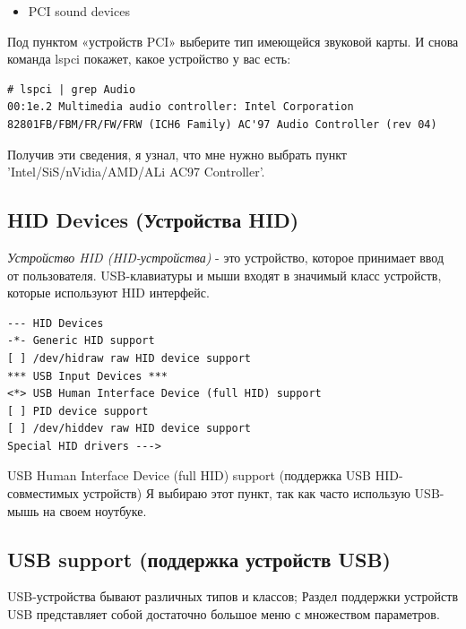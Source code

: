 \documentclass[10pt]{book}
\begin{document}
\begin{itemize}
\item PCI sound devices
\end{itemize}

Под пунктом «устройств PCI» выберите тип имеющейся звуковой карты. И снова команда lspci покажет, какое устройство у вас есть:

\vspace{3mm}
\begin{tcolorbox}
\begin{lstlisting}
# lspci | grep Audio
00:1e.2 Multimedia audio controller: Intel Corporation 82801FB/FBM/FR/FW/FRW (ICH6 Family) AC'97 Audio Controller (rev 04)
\end{lstlisting}
\end{tcolorbox}

Получив эти сведения, я узнал, что мне нужно выбрать пункт 'Intel/SiS/nVidia/AMD/ALi AC97 Controller'.

\subsection{HID Devices (Устройства HID)}

\textit{Устройство HID (HID-устройства)} - это устройство, которое принимает ввод от пользователя. USB-клавиатуры и мыши входят в значимый класс устройств, которые используют HID интерфейс.

\vspace{3mm}
\begin{tcolorbox}[colback=gray!14!white, colframe=blue!75!blue]
\begin{lstlisting}
--- HID Devices
-*- Generic HID support
[ ] /dev/hidraw raw HID device support
*** USB Input Devices ***
<*> USB Human Interface Device (full HID) support
[ ] PID device support
[ ] /dev/hiddev raw HID device support
Special HID drivers --->
\end{lstlisting}
\end{tcolorbox}

 USB Human Interface Device (full HID) support (поддержка USB HID-совместимых устройств)
Я выбираю этот пункт, так как часто использую USB-мышь на своем ноутбуке.

\subsection{USB support (поддержка устройств USB)}

USB-устройства бывают различных типов и классов; Раздел поддержки устройств USB  представляет собой достаточно большое меню с множеством параметров. 
\end{document}

